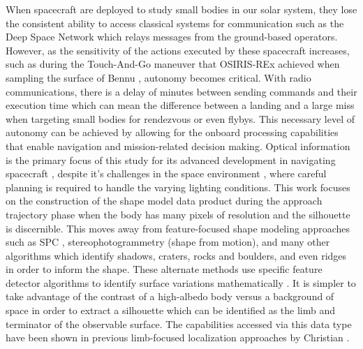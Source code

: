 When spacecraft are deployed to study small bodies in our solar system, they lose the consistent ability to access classical systems for communication such as the Deep Space Network which relays messages from the ground-based operators. However, as the sensitivity of the actions executed by these spacecraft increases, such as during the Touch-And-Go maneuver that OSIRIS-REx achieved when sampling the surface of Bennu \cite{Berry2013}, autonomy becomes critical. With radio communications, there is a delay of minutes between sending commands and their execution time which can mean the difference between a landing and a large miss when targeting small bodies for rendezvous or even flybys. This necessary level of autonomy can be achieved by allowing for the onboard processing capabilities that enable navigation and mission-related decision making. Optical information is the primary focus of this study for its advanced development in navigating spacecraft \cite{Owen2011}, despite it's challenges in the space environment \cite{DellaGiustina2018}, where careful planning is required to handle the varying lighting conditions. This work focuses on the construction of the shape model data product during the approach trajectory phase when the body has many pixels of resolution and the silhouette is discernible. This moves away from feature-focused shape modeling approaches such as SPC \cite{Gaskell2008}, stereophotogrammetry (shape from motion)\cite{Hartley2000}, and many other algorithms which identify shadows, craters, rocks and boulders, and even ridges in order to inform the shape. These alternate methods use specific feature detector algorithms to identify surface variations mathematically \cite{Lowe2004}. It is simpler to take advantage of the contrast of a high-albedo body versus a background of space in order to extract a silhouette which can be identified as the limb and terminator of the observable surface. The capabilities accessed via this data type have been shown in previous limb-focused localization approaches by Christian \cite{Christian2017}. 

